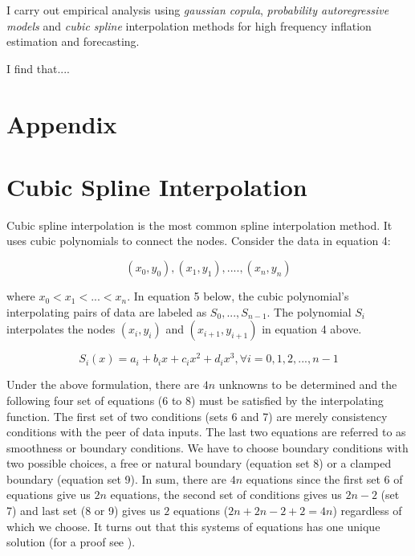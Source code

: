 \documentclass[12pt]{article}
\newcommand{\1}{\mathbbm 1}
\begin{document}
		I carry out empirical analysis using \textit{gaussian copula}, \textit{probability autoregressive models} and \textit{cubic spline} interpolation methods for high frequency inflation estimation and forecasting.
		
		I find that....
		
		
		
		
		
		
		
		
		
		
		
		
		
		\newpage
		
		
		
		
		
		
		
		
		
		
		
		
		\section*{Appendix}
		
		
		\section*{Cubic Spline Interpolation}
		
		Cubic spline interpolation is the most common spline interpolation method. It uses cubic polynomials to connect the nodes. Consider the data in equation 4:
		
		\begin{equation}
			(x_{0}, y_{0}), (x_{1}, y_{1}), .... , (x_{n}, y_{n})
		\end{equation}
		
		
		where $x_{0} < x_{1} < ... < x_{n}$. In equation 5 below, the cubic polynomial's interpolating pairs of data are labeled as $S_{0},..., S_{n-1}$. The polynomial $S_{i}$ interpolates the nodes $(x_{i}, y_{i})$ and $(x_{i+1}, y_{i+1})$ in equation 4 above.
		
		
		\begin{equation}
			S_{i}(x) = a_{i} + b_{i}x + c_{i}x^{2} + d_{i}x^{3}, \forall i = 0, 1, 2, ... ,n-1
		\end{equation}
		
		
		Under the above formulation, there are $4n$ unknowns to be determined and the following four set of equations (6 to 8) must be satisfied by the interpolating function. The first set of two conditions (sets 6 and 7) are merely consistency conditions with the peer of data inputs. The last two equations are referred to as smoothness or boundary conditions. We have to choose boundary conditions with two possible choices, a free or natural boundary (equation set 8) or a clamped boundary (equation set 9). In sum, there are $4n$ equations since the first set 6 of equations give us $2n$ equations, the second set of conditions gives us $2n-2$ (set 7) and last set (8 or 9) gives us $2$ equations ($2n + 2n -2 + 2 = 4n$) regardless of which we choose. It turns out that this systems of equations has one unique solution (for a proof see \cite{burden2015numerical}).
		
\end{document}
